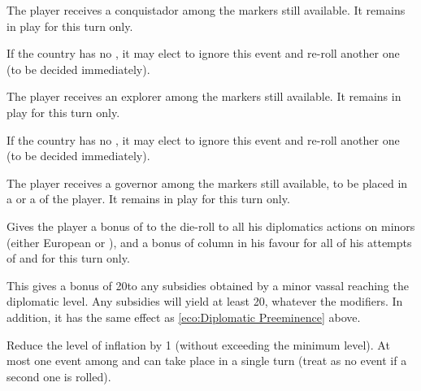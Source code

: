 The player receives a conquistador among the \anonyme \LeaderC markers still
available. It remains in play for this turn only.




If the country has no \anonyme\LeaderE, it may elect to ignore this event and
re-roll another one (to be decided immediately).

The player receives an explorer among the \anonyme \LeaderE markers still
available. It remains in play for this turn only.




If the country has no \anonyme\LeaderGov, it may elect to ignore this event
and re-roll another one (to be decided immediately).

The player receives a governor among the \anonyme \LeaderG markers still
available, to be placed in a \TP or a \COL of the player.  It remains in play
for this turn only.




Gives the player a bonus of  to the die-roll to all his diplomatics
actions on minors (either European or \ROTW), and a bonus of  column
in his favour for all of his attempts of \TP and \COLaction for this turn
only.




This gives a bonus of 20\ducats to any subsidies obtained by a minor vassal
reaching the \SUB diplomatic level. Any subsidies will yield at least
20\ducats, whatever the modifiers.  In addition, it has the same effect as
\ref{eco:Diplomatic Preeminence} above.




Reduce the level of inflation by 1 (without exceeding the minimum level). At
most one event among  and  can
take place in a single turn (treat as no event if a second one is rolled).




